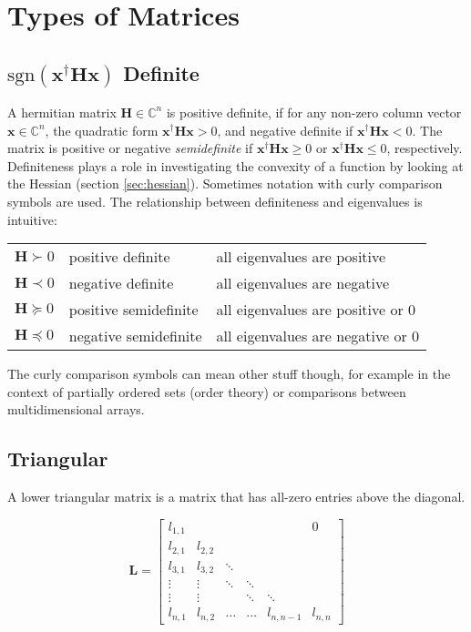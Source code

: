 \section{Types of Matrices}

\subsection{$\mathrm{sgn}\left(\mathbf{x}^{\dagger}\mathbf{H}\mathbf{x}\right)$ Definite}
\label{sec:definite}

A hermitian matrix $\mathbf{H}\in\mathbb{C}^n$ is positive definite, if for any non-zero column vector $\mathbf{x}\in\mathbb{C}^n$, the quadratic form $\mathbf{x}^{\dagger}\mathbf{H}\mathbf{x} > 0$, and negative definite if $\mathbf{x}^{\dagger}\mathbf{H}\mathbf{x} < 0$. The matrix is positive or negative \textit{semidefinite} if  $\mathbf{x}^{\dagger}\mathbf{H}\mathbf{x} \geq 0$ or $\mathbf{x}^{\dagger}\mathbf{H}\mathbf{x} \leq 0$, respectively. Definiteness plays a role in investigating the convexity of a function by looking at the Hessian (section \ref{sec:hessian}). Sometimes notation with curly comparison symbols are used. The relationship between definiteness and eigenvalues is intuitive:

\begin{tabular}{lll}
$\mathbf{H} \succ 0$ & positive definite & all eigenvalues are positive\\
$\mathbf{H} \prec 0$ & negative definite & all eigenvalues are negative\\
$\mathbf{H} \succeq 0$ & positive semidefinite & all eigenvalues are positive or 0\\
$\mathbf{H} \preceq 0$ & negative semidefinite & all eigenvalues are negative or 0
\centering
\end{tabular}

The curly comparison symbols can mean other stuff though, for example in the context of partially ordered sets (order theory) or comparisons between multidimensional arrays.





\subsection{Triangular}
\label{sec:triangular}
A lower triangular matrix is a matrix that has all-zero entries above the diagonal.


\begin{equation}
\mathbf{L} = \left[\begin{array}{cccccc} l_{1,1}&&&&&0\\l_{2,1}&l_{2,2}&&&&\\l_{3,1}&l_{3,2}&\ddots&&&\\  \vdots&\vdots&\ddots&\ddots&&\\ \vdots&\vdots&&\ddots&\ddots&\\  l_{n,1}&l_{n,2}&\hdots&\hdots&l_{n,n-1}&l_{n,n}\end{array}\right]
\end{equation}

